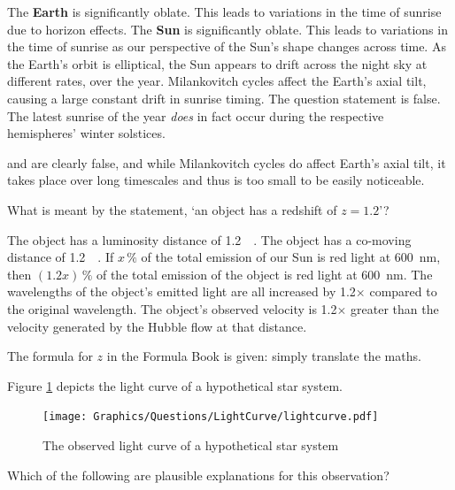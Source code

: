 \documentclass[a4paper,11pt]{exam}
\begin{document}
\begin{questions}
	\begin{choices}
		\choice	The \textbf{Earth} is significantly oblate. This leads to variations in the time of sunrise due to horizon effects.
		\choice	The \textbf{Sun} is significantly oblate. This leads to variations in the time of sunrise as our perspective of the Sun’s shape changes across time.
		\correctchoice	As the Earth’s orbit is elliptical, the Sun appears to drift across the night sky at different rates, over the year.
		\choice	Milankovitch cycles affect the Earth’s axial tilt, causing a large constant drift in sunrise timing.
		\choice	The question statement is false. The latest sunrise of the year \textit{does} in fact occur during the respective hemispheres' winter solstices.
	\end{choices}
	\begin{solution}
		 and  are clearly false, and while Milankovitch cycles do affect Earth’s axial tilt, it takes place over long timescales and thus is too small to be easily noticeable.
	\end{solution}

\filbreak
\question
	What is meant by the statement, `an object has a redshift of $ z = 1.2 $'?
	\begin{choices}
		\choice	The object has a luminosity distance of \SI{1.2}{\mega\parsec}.
		\choice	The object has a co-moving distance of \SI{1.2}{\mega\parsec}.
		\choice	If $x\,\%$  of the total emission of our Sun is red light at \SI{600}{\nano\metre}, then $(1.2x) \,\%$ of the total emission of the object is red light at \SI{600}{\nano\metre}.
		\correctchoice	The wavelengths of the object’s emitted light are all increased by \num{1.2}$\times$ compared to the original wavelength.
		\choice	The object’s observed velocity is 1.2$\times$ greater than the velocity generated by the Hubble flow at that distance.
	\end{choices}
	\begin{solution}
		The formula for $ z $ in the Formula Book is given: simply translate the maths.
	\end{solution}

\filbreak
\question
	Figure \ref{q11} depicts the light curve of a hypothetical star system.
	\begin{figure}[H]
		\centering
		\texttt{[image: Graphics/Questions/LightCurve/lightcurve.pdf]}
		\caption{The observed light curve of a hypothetical star system}
		\label{q11}
	\end{figure}

	Which of the following are plausible explanations for this observation?


\end{questions}
\end{document}

